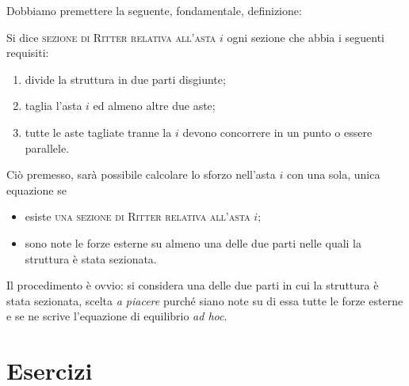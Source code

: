\noindent Dobbiamo premettere la seguente, fondamentale, definizione: 
\begin{definizione}
Si dice \textsc{sezione di Ritter relativa all'asta} $i$ ogni sezione che abbia i seguenti requisiti:
\begin{enumerate}
\item divide la struttura in due parti disgiunte;
\item taglia l'asta $i$ ed almeno altre due aste;
\item tutte le aste tagliate tranne la $i$ devono concorrere in un punto o essere parallele.
\end{enumerate}
\end{definizione}
\noindent Ciò premesso, sarà possibile calcolare lo sforzo nell'asta $i$ con una sola, unica equazione se 
\begin{itemize}
\item esiste \textsc{una sezione di Ritter relativa all'asta} $i$;
\item sono note le forze esterne su almeno una delle due parti nelle quali la struttura è stata sezionata. 
\end{itemize}
Il procedimento è ovvio: si considera una delle due parti in cui la struttura è stata sezionata, scelta \emph{a piacere} purché siano note su di essa tutte le forze esterne e se ne scrive l'equazione di equilibrio \emph{ad hoc}.
\clearpage
\section{Esercizi}
